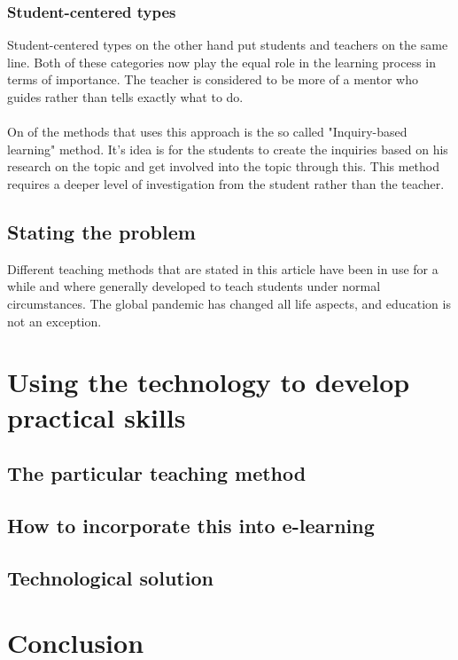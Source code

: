 \documentclass[10pt,oneside,english,a4paper]{article}
\begin{document}
\subsubsection{Student-centered types}
Student-centered types on the other hand put students and teachers on the same line. Both of these categories now play the equal role in the learning process in terms of importance. The teacher is considered to be more of a mentor who guides rather than tells exactly what to do.\paragraph{} 
On of the methods that uses this approach is the so called "Inquiry-based learning" method.\cite{inquiry} It's idea is for the students to create the inquiries based on his research on the topic and get involved into the topic through this. This method requires a deeper level of investigation from the student rather than the teacher. 

\subsection{Stating the problem}
Different teaching methods that are stated in this article have been in use for a while and where generally developed to teach students under normal circumstances. The global pandemic has changed all life aspects, and education is not an exception. \paragraph{} 


\section{Using the technology to develop practical skills} \label{chan}

\subsection{The particular teaching method}

\subsection{How to incorporate this into e-learning}

\subsection{Technological solution}

\section{Conclusion} \label{zaver} %




\end{document}
